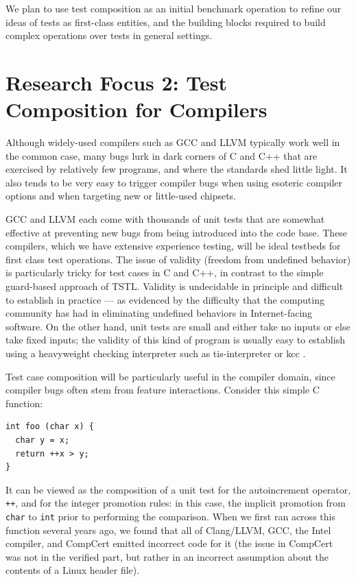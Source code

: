 We plan to use test composition as an initial benchmark operation to
refine our ideas of tests as first-class entities, and the building
blocks required to build complex operations over tests in general
settings.

\section{Research Focus 2: Test Composition for Compilers}

Although widely-used compilers such as GCC and LLVM typically work
well in the common case, many bugs lurk in dark corners of C and C++
that are exercised by relatively few programs, and where the
standards shed little light.
%
It also tends to be very easy to trigger compiler bugs when using
esoteric compiler options and when targeting new or little-used
chipsets.


GCC and LLVM each come with thousands of unit tests that are somewhat
effective at preventing new bugs from being introduced into the code
base.
%
These compilers, which we have extensive experience
testing\cite{csmith}, will be ideal testbeds for first class
test operations.
%
The issue of validity (freedom from undefined behavior) is particularly tricky
for test cases in C and C++\cite{EllisonRosu12POPL}, in contrast to
the simple guard-based approach of TSTL.
%
Validity is undecidable in principle and difficult to
establish in practice --- as evidenced by the difficulty that the
computing community has had in eliminating undefined behaviors in
Internet-facing software.
%
On the other hand, unit tests are small and either take no inputs or
else take fixed inputs; the validity of this kind of program is
usually easy to establish using a heavyweight checking interpreter
such as tis-interpreter \cite{TIS} 
or kcc \cite{KCC,EllisonRosu12POPL,Hathhorn}.


Test case composition will be particularly useful in
the compiler domain, since compiler bugs often stem from feature interactions.
%
Consider this simple C function:

{\small
\begin{verbatim}
int foo (char x) {
  char y = x;
  return ++x > y;
}
\end{verbatim}
}

It can be viewed as the composition of a unit test for the
 autoincrement operator, \texttt{++}, and for the integer promotion
 rules: in this case, the implicit promotion from \texttt{char} to
 \texttt{int} prior to performing the comparison.
%
When we first ran across this function several years ago, we found
that all of Clang/LLVM, GCC, the Intel compiler, and CompCert emitted
incorrect code for it (the issue in CompCert was not in the
verified part, but rather in an incorrect assumption about the
contents of a Linux header file).


